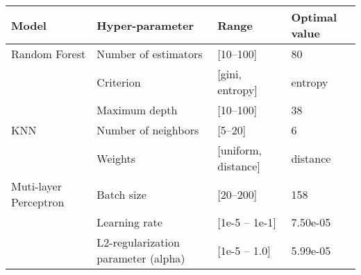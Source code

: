 \documentclass[11pt,a4paper]{article}
\begin{document}
\begin{table*}[]
\centering
\begin{tabular}{|l|l|l|l|}
\hline
Model                 & Hyper-parameter                     & Range                                                                                                                                          & Optimal value \\ \hline
Random Forest         & Number of estimators                & {[}10--100{]}                                                                                                                                   & 80            \\ \cline{2-4} 
                      & Criterion                           & {[}gini, entropy{]}                                                                                                                            & entropy       \\ \cline{2-4} 
                      & Maximum depth                       & {[}10--100{]}                                                                                                                                   & 38            \\ \hline
KNN                   & Number of neighbors                 & {[}5--20{]}                                                                                                                                     & 6             \\ \cline{2-4} 
                      & Weights                             & {[}uniform, distance{]}                                                                                                                        & distance      \\ \hline
Muti-layer Perceptron & Batch size                          & {[}20--200{]}                                                                                                                                   & 158           \\ \cline{2-4} 
                      & Learning rate                       & [1e-5 -- 1e-1]                                                                                                                                    & 7.50e-05      \\ \cline{2-4} 
                      & L2-regularization parameter (alpha) & [1e-5 -- 1.0]                                                                                                                                     & 5.99e-05      \\ \cline{2-4} 

\end{tabular}
\end{table*}
\end{document}

